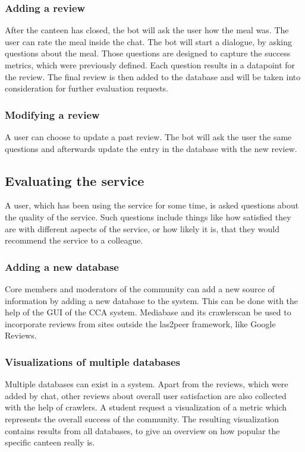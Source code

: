 \subsubsection{Adding a review} After the canteen has closed, the bot will ask the user how the meal was. The user can rate the meal inside the chat. The bot will start a dialogue, by asking questions about the meal. Those questions are designed to capture the success metrics, which were previously defined. Each question results in a datapoint for the review. The final review is then added to the database and will be taken into consideration for further evaluation requests.

\subsubsection{Modifying a review} A user can choose to update a past review. The bot will ask the user the same questions and afterwards update the entry in the database with the new review.

\subsection{Evaluating the service} A user, which has been using the service for some time, is asked questions about the quality of the service. Such questions include things like how satisfied they are with different aspects of the service, or how likely it is, that they would recommend the service to a colleague.

\subsubsection{Adding a new database} Core members and moderators of the community can add a new source of information by adding a new database to the system. This can be done with the help of the GUI of the CCA system. Mediabase and its crawlerscan be used to incorporate reviews from sites outside the las2peer framework, like Google Reviews.

\subsubsection{Visualizations of multiple databases} Multiple databases can exist in a system. Apart from the reviews, which were added by chat, other reviews about overall user satisfaction are also collected with the help of crawlers. A student request a visualization of a metric which represents the overall success of the community. The resulting visualization contains results from all databases, to give an overview on how popular the specific canteen really is.



